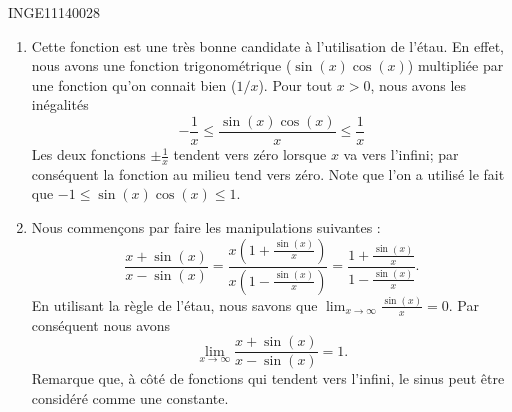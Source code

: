 

\begin{corrige}{INGE11140028}

	\begin{enumerate}

		\item
			Cette fonction est une très bonne candidate à l'utilisation de l'étau. En effet, nous avons une fonction trigonométrique ($\sin(x)\cos(x)$) multipliée par une fonction qu'on connait bien ($1/x$). Pour tout $x>0$, nous avons les inégalités
			\begin{equation}
				-\frac{1}{ x }\leq\frac{ \sin(x)\cos(x) }{ x }\leq \frac{1}{ x }
			\end{equation}
			Les deux fonctions $\pm\frac{1}{ x }$ tendent vers zéro lorsque $x$ va vers l'infini; par conséquent la fonction au milieu tend vers zéro.
			Note que l'on a utilisé le fait que $-1\leq \sin(x)\cos(x)\leq 1$.

		\item \label{ItemB40028ex}

			Nous commençons par faire les manipulations suivantes :
			\begin{equation}
				\frac{ x+\sin(x) }{ x-\sin(x) }=\frac{ x\left( 1+\frac{ \sin(x) }{ x } \right) }{ x\left( 1-\frac{ \sin(x) }{ x } \right) }=\frac{ 1+\frac{ \sin(x) }{ x } }{ 1-\frac{ \sin(x) }{ x } }.
			\end{equation}
			En utilisant la règle de l'étau, nous savons que $\lim_{x\to \infty} \frac{ \sin(x) }{ x }=0$. Par conséquent nous avons
			\begin{equation}
				\lim_{x\to \infty} \frac{ x+\sin(x) }{ x-\sin(x) }=1.
			\end{equation}
			Remarque que, à côté de fonctions qui tendent vers l'infini, le sinus peut être considéré comme une constante.

	\end{enumerate}

\end{corrige}
